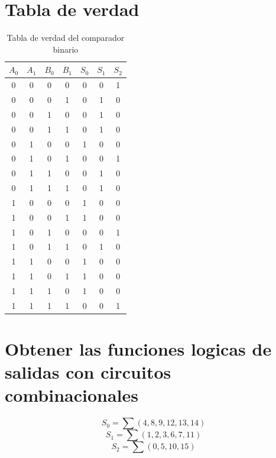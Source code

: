 \documentclass{informeutn}
\begin{document}
\section{Tabla de verdad}

\begin{table}[h]
  \centering
  \begin{tabular}{cccc|ccc}
    $A_0$ & $A_1$ & $B_0$ & $B_1$ & $S_0$ & $S_1$ & $S_2$\\
    \hline
    0 & 0 & 0 & 0 & 0 & 0 & 1\\
    0 & 0 & 0 & 1 & 0 & 1 & 0\\
    0 & 0 & 1 & 0 & 0 & 1 & 0\\
    0 & 0 & 1 & 1 & 0 & 1 & 0\\
    0 & 1 & 0 & 0 & 1 & 0 & 0\\
    0 & 1 & 0 & 1 & 0 & 0 & 1\\
    0 & 1 & 1 & 0 & 0 & 1 & 0\\
    0 & 1 & 1 & 1 & 0 & 1 & 0\\
    1 & 0 & 0 & 0 & 1 & 0 & 0\\
    1 & 0 & 0 & 1 & 1 & 0 & 0\\
    1 & 0 & 1 & 0 & 0 & 0 & 1\\
    1 & 0 & 1 & 1 & 0 & 1 & 0\\
    1 & 1 & 0 & 0 & 1 & 0 & 0\\
    1 & 1 & 0 & 1 & 1 & 0 & 0\\
    1 & 1 & 1 & 0 & 1 & 0 & 0\\
    1 & 1 & 1 & 1 & 0 & 0 & 1\\
  \end{tabular}
  \caption{Tabla de verdad del comparador binario}
\end{table}

\section{Obtener las funciones logicas de salidas con circuitos combinacionales}

\begin{equation*}
  S_0=\sum(4,8,9,12,13,14)
\end{equation*}
\begin{equation*}
  S_1=\sum(1,2,3,6,7,11)
\end{equation*}
\begin{equation*}
  S_2=\sum(0,5,10,15)
\end{equation*}
\end{document}

